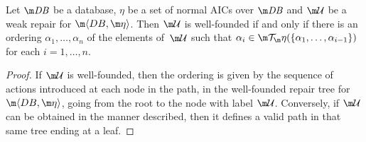\begin{proposition}
  \label{prop:wf}
  Let $\db$ be a database, $\eta$ be a set of normal AICs over $\db$ and $\UU$ be a weak repair for $\fulldb$.
  Then $\UU$ is well-founded if and only if there is an ordering $\alpha_1,\ldots,\alpha_n$ of the elements of\, $\UU$ such that $\alpha_i\in\Op(\{\alpha_1,\ldots,\alpha_{i-1}\})$ for each $i=1,\ldots,n$.
\end{proposition}
\begin{proof}
  If $\UU$ is well-founded, then the ordering is given by the sequence of actions introduced at each node in the path, in the well-founded repair tree for $\fulldb$, going from the root to the node with label $\UU$.
  Conversely, if $\UU$ can be obtained in the manner described, then it defines a valid path in that same tree ending at a leaf.
\end{proof}



